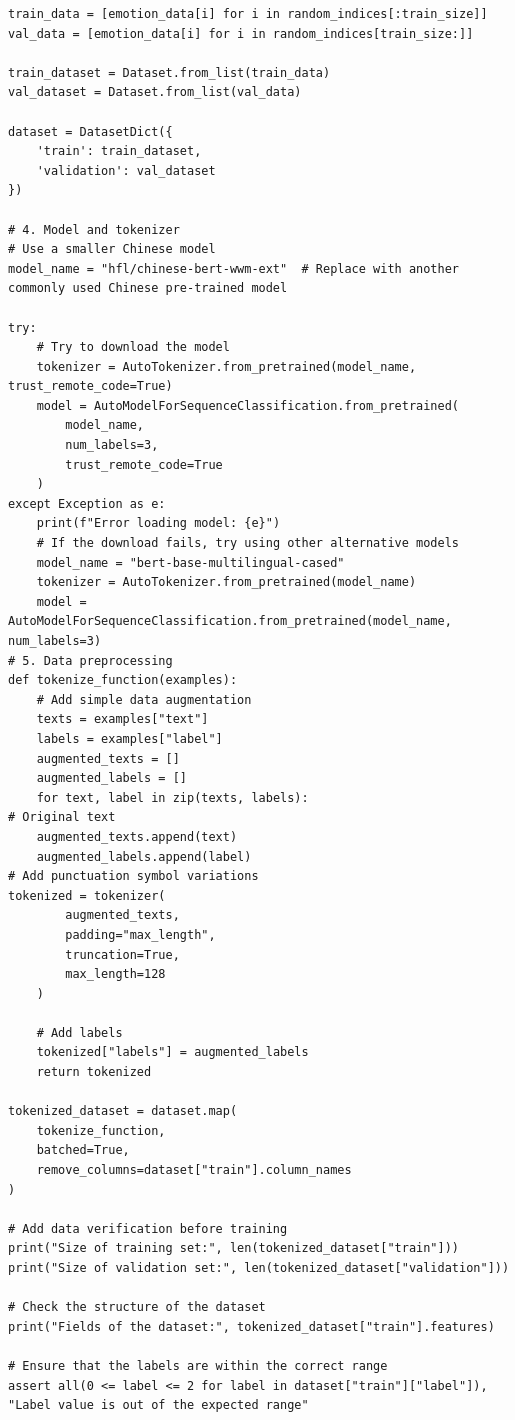 \documentclass[journal]{IEEEtran}
\begin{document}
\begin{verbatim}
train_data = [emotion_data[i] for i in random_indices[:train_size]]
val_data = [emotion_data[i] for i in random_indices[train_size:]]

train_dataset = Dataset.from_list(train_data)
val_dataset = Dataset.from_list(val_data)

dataset = DatasetDict({
    'train': train_dataset,
    'validation': val_dataset
})

# 4. Model and tokenizer
# Use a smaller Chinese model
model_name = "hfl/chinese-bert-wwm-ext"  # Replace with another commonly used Chinese pre-trained model

try:
    # Try to download the model
    tokenizer = AutoTokenizer.from_pretrained(model_name, trust_remote_code=True)
    model = AutoModelForSequenceClassification.from_pretrained(
        model_name,
        num_labels=3,
        trust_remote_code=True
    )
except Exception as e:
    print(f"Error loading model: {e}")
    # If the download fails, try using other alternative models
    model_name = "bert-base-multilingual-cased"
    tokenizer = AutoTokenizer.from_pretrained(model_name)
    model = AutoModelForSequenceClassification.from_pretrained(model_name, num_labels=3)
# 5. Data preprocessing
def tokenize_function(examples):
    # Add simple data augmentation
    texts = examples["text"]
    labels = examples["label"]
    augmented_texts = []
    augmented_labels = []
    for text, label in zip(texts, labels):
# Original text
    augmented_texts.append(text)
    augmented_labels.append(label)
# Add punctuation symbol variations
tokenized = tokenizer(
        augmented_texts,
        padding="max_length",
        truncation=True,
        max_length=128
    )

    # Add labels
    tokenized["labels"] = augmented_labels
    return tokenized

tokenized_dataset = dataset.map(
    tokenize_function,
    batched=True,
    remove_columns=dataset["train"].column_names
)

# Add data verification before training
print("Size of training set:", len(tokenized_dataset["train"]))
print("Size of validation set:", len(tokenized_dataset["validation"]))

# Check the structure of the dataset
print("Fields of the dataset:", tokenized_dataset["train"].features)

# Ensure that the labels are within the correct range
assert all(0 <= label <= 2 for label in dataset["train"]["label"]), "Label value is out of the expected range"


\end{verbatim}
\end{document}
